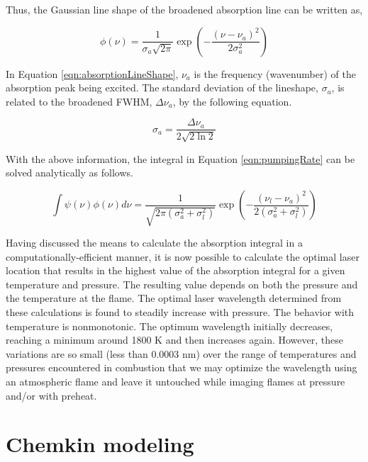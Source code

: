 Thus, the Gaussian line shape of the broadened absorption line can be written as,

\begin{equation}
  \phi(\nu) = \frac{1}{\sigma_a\sqrt{2\pi}} \exp{\left(-\dfrac{(\nu-\nu_a)^2}{2\sigma_a^2}\right)}
  \label{eqn:absorptionLineShape}
\end{equation}


In Equation \ref{eqn:absorptionLineShape}, \(\nu_a\) is the frequency (wavenumber) of the absorption peak being excited.
The standard deviation of the lineshape, \(\sigma_a\), is related to the broadened FWHM, \(\Delta\nu_a\), by the following equation.

\begin{equation}
  \sigma_a = \frac{\Delta\nu_a}{2 \sqrt{ 2 \ln{2} } }
\end{equation}

With the above information, the integral in Equation \ref{eqn:pumpingRate} can be solved analytically as follows.

\begin{equation}
  \int \psi(\nu) \phi(\nu) d\nu = \frac{1}{\sqrt{2\pi ( \sigma_a^2 + \sigma_l^2 )}} \exp{\left(-\frac{ (\nu_l - \nu_a )^2 }{2 ( \sigma_a^2 + \sigma_l^2 )}\right)}
  \label{eqn:absorptionIntegral}
\end{equation}

Having discussed the means to calculate the absorption integral in a computationally-efficient manner, it is now possible to calculate the optimal laser location that results in the highest value of the absorption integral for a given temperature and pressure.
The resulting value depends on both the pressure and the temperature at the flame.
The optimal laser wavelength determined from these calculations is found to steadily increase with pressure.
The behavior with temperature is nonmonotonic. The optimum wavelength initially decreases, reaching a minimum around 1800 K and then increases again.
However, these variations are so small (less than 0.0003 nm) over the range of temperatures and pressures encountered in combustion that we may optimize the wavelength using an atmospheric flame and leave it untouched while imaging flames at pressure and/or with preheat.

\section{Chemkin modeling}

